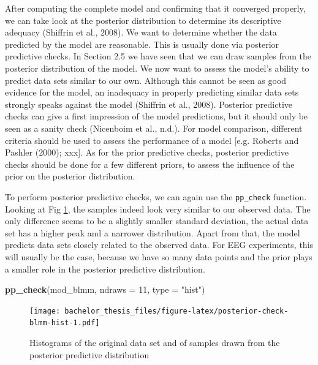 \documentclass[
  doc,12pt,floatsintext]{apa7}
\newenvironment{Shaded}{\begin{snugshade}}{\end{snugshade}}
\newcommand{\AttributeTok}[1]{\textcolor[rgb]{0.13,0.29,0.53}{#1}}
\newcommand{\DecValTok}[1]{\textcolor[rgb]{0.00,0.00,0.81}{#1}}
\newcommand{\FunctionTok}[1]{\textcolor[rgb]{0.13,0.29,0.53}{\textbf{#1}}}
\newcommand{\NormalTok}[1]{#1}
\newcommand{\StringTok}[1]{\textcolor[rgb]{0.31,0.60,0.02}{#1}}
\begin{document}
After computing the complete model and confirming that it converged properly, we can take look at the posterior distribution to determine its descriptive adequacy (Shiffrin et al., 2008). We want to determine whether the data predicted by the model are reasonable. This is usually done via posterior predictive checks. In Section 2.5 we have seen that we can draw samples from the posterior distribution of the model. We now want to assess the model's ability to predict data sets similar to our own. Although this cannot be seen as good evidence for the model, an inadequacy in properly predicting similar data sets strongly speaks against the model (Shiffrin et al., 2008). Posterior predictive checks can give a first impression of the model predictions, but it should only be seen as a sanity check (Nicenboim et al., n.d.). For model comparison, different criteria should be used to assess the performance of a model {[}e.g. Roberts and Pashler (2000); xxx{]}. As for the prior predictive checks, posterior predictive checks should be done for a few different priors, to assess the influence of the prior on the posterior distribution.

To perform posterior predictive checks, we can again use the \texttt{pp\_check} function. Looking at Fig \ref{fig:posterior-check-blmm-hist}, the samples indeed look very similar to our observed data. The only difference seems to be a slightly smaller standard deviation, the actual data set has a higher peak and a narrower distribution. Apart from that, the model predicts data sets closely related to the observed data. For EEG experiments, this will usually be the case, because we have so many data points and the prior plays a smaller role in the posterior predictive distribution.



\begin{Shaded}
\begin{Highlighting}[]
\FunctionTok{pp\_check}\NormalTok{(mod\_blmm, }\AttributeTok{ndraws =} \DecValTok{11}\NormalTok{, }\AttributeTok{type =} \StringTok{"hist"}\NormalTok{)}
\end{Highlighting}
\end{Shaded}

\begin{figure}
\centering
\texttt{[image: bachelor\_thesis\_files/figure-latex/posterior-check-blmm-hist-1.pdf]}
\caption{\label{fig:posterior-check-blmm-hist}Histograms of the original data set and of samples drawn from the posterior predictive distribution}
\end{figure}
\end{document}
